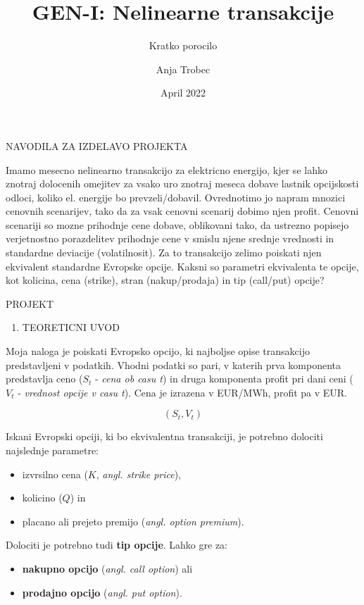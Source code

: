 \documentclass[
]{article}
\title{GEN-I: Nelinearne transakcije}
\subtitle{Kratko porocilo}
\author{Anja Trobec}
\date{April 2022}
\providecommand{\tightlist}{%
  \setlength{\itemsep}{0pt}\setlength{\parskip}{0pt}}
\begin{document}
\maketitle

NAVODILA ZA IZDELAVO PROJEKTA

Imamo mesecno nelinearno transakcijo za elektricno energijo, kjer se
lahko znotraj dolocenih omejitev za vsako uro znotraj meseca dobave
lastnik opcijskosti odloci, koliko el. energije bo prevzeli/dobavil.
Ovrednotimo jo napram mnozici cenovnih scenarijev, tako da za vsak
cenovni scenarij dobimo njen profit. Cenovni scenariji so mozne
prihodnje cene dobave, oblikovani tako, da ustrezno popisejo
verjetnostno porazdelitev prihodnje cene v smislu njene srednje
vrednosti in standardne deviacije (volatilnosit). Za to transakcijo
zelimo poiskati njen ekvivalent standardne Evropske opcije. Kaksni so
parametri ekvivalenta te opcije, kot kolicina, cena (strike), stran
(nakup/prodaja) in tip (call/put) opcije?

PROJEKT

\begin{enumerate}
\def\labelenumi{\arabic{enumi}.}
\tightlist
\item
  TEORETICNI UVOD
\end{enumerate}

Moja naloga je poiskati Evropsko opcijo, ki najboljse opise transakcijo
predstavljeni v podatkih. Vhodni podatki so pari, v katerih prva
komponenta predstavlja ceno (\emph{\(S_t\)} - \emph{cena ob casu t}) in
druga komponenta profit pri dani ceni (\emph{\(V_t\)} - \emph{vrednost
opcije v casu t}). Cena je izrazena v EUR/MWh, profit pa v EUR.

\[(S_t,V_t) \]

Iskani Evropski opciji, ki bo ekvivalentna transakciji, je potrebno
dolociti najslednje parametre:

\begin{itemize}
\tightlist
\item
  izvrsilno cena (\(K\), \emph{angl. strike price}),
\item
  kolicino (\(Q\)) in
\item
  placano ali prejeto premijo (\emph{angl. option premium}).
\end{itemize}

Dolociti je potrebno tudi \textbf{tip opcije}. Lahko gre za:

\begin{itemize}
\tightlist
\item
  \textbf{nakupno opcijo} (\emph{angl. call option}) ali
\item
  \textbf{prodajno opcijo} (\emph{angl. put option}).
\end{itemize}
\end{document}
